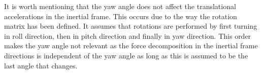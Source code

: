 
It is worth mentioning that the yaw angle does not affect the translational accelerations in the inertial frame. This occurs due to the way the rotation matrix has been defined. It assumes that rotations are performed by first turning in roll direction, then in pitch direction and finally in yaw direction. This order makes the yaw angle not relevant as the force decomposition in the inertial frame directions is independent of the yaw angle as long as this is assumed to be the last angle that changes.